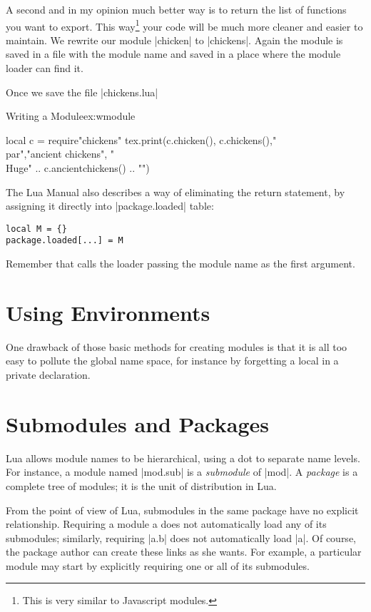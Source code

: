 A second and in my opinion much better way is to return the list of functions you want to export. This way\footnote{This is very similar to Javascript modules.} your code will be much more cleaner and easier to maintain. We rewrite our module |chicken|  to |chickens|. Again the module is saved in a file with the module name and saved in a place where the module loader can find it. 

Once we save the file |chickens.lua|

\begin{texexample}{Writing a Module}{ex:wmodule}
\begin{luacode}
   local c = require"chickens"
   tex.print(c.chicken(), c.chickens(),"\\par","ancient chickens", "{\\Huge" .. c.ancientchickens() .. "}")
\end{luacode}
\end{texexample}



The Lua Manual also describes a way of eliminating the return statement, by assigning it directly into |package.loaded| table:

\begin{verbatim}
local M = {}
package.loaded[...] = M
\end{verbatim}

Remember that  calls the loader passing the module name as the first argument.

\section{Using Environments}

One drawback of those basic methods for creating modules is that it is all too easy to pollute the global name space, for instance by forgetting a local in a private declaration.

\section{Submodules and Packages}

Lua allows module names to be hierarchical, using a dot to separate name levels. For instance, a module named |mod.sub| is a \textit{submodule} of |mod|. A \textit{package} is a complete tree of modules; it is the unit of distribution in Lua. 

From the point of view of Lua, submodules in the same package have no explicit relationship. Requiring a module a does not automatically load any of its submodules; similarly, requiring |a.b| does not automatically load |a|. Of course, the package author can create these links as she wants. For example, a particular module may start by explicitly requiring one or all of its submodules.

